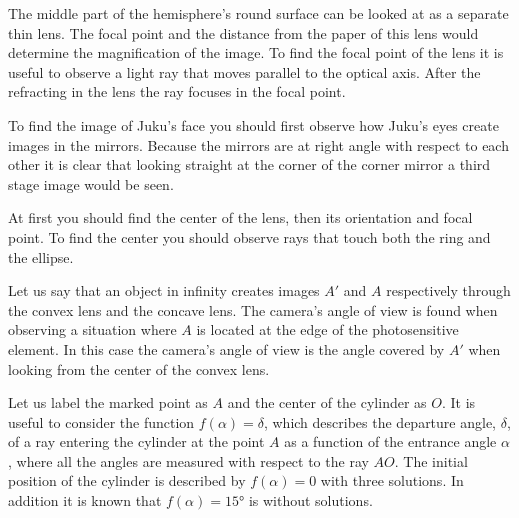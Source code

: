 \documentclass[11pt]{article}
\begin{document}

\hinteng
The middle part of the hemisphere’s round surface can be looked at as a separate thin lens. The focal point and the distance from the paper of this lens would determine the magnification of the image. To find the focal point of the lens it is useful to observe a light ray that moves parallel to the optical axis. After the refracting in the lens the ray focuses in the focal point.
\probend
\bigskip


\hinteng
To find the image of Juku’s face you should first observe how Juku’s eyes create images in the mirrors. Because the mirrors are at right angle with respect to each other it is clear that looking straight at the corner of the corner mirror a third stage image would be seen.
\probend
\bigskip


\hinteng
At first you should find the center of the lens, then its orientation and focal point. To find the center you should observe rays that touch both the ring and the ellipse.
\probend
\bigskip


\hinteng
Let us say that an object in infinity creates images $A'$ and $A$ respectively through the convex lens and the concave lens. The camera’s angle of view is found when observing a situation where $A$ is located at the edge of the photosensitive element. In this case the camera’s angle of view is the angle covered by $A'$ when looking from the center of the convex lens.
\probend
\bigskip


\hinteng
Let us label the marked point as $A$ and the center of the cylinder as $O$. It is useful to consider the function $f(\alpha) = \delta$, which describes the departure angle, $\delta$, of a ray entering the cylinder at the point $A$ as a function of the entrance angle $\alpha$, where all the angles are measured with respect to the ray $AO$. The initial position of the cylinder is described by $f(\alpha) = 0$ with three solutions. In addition it is known that $f(\alpha) = \ang{15}$ is without solutions.
\probend
\bigskip
\end{document}
